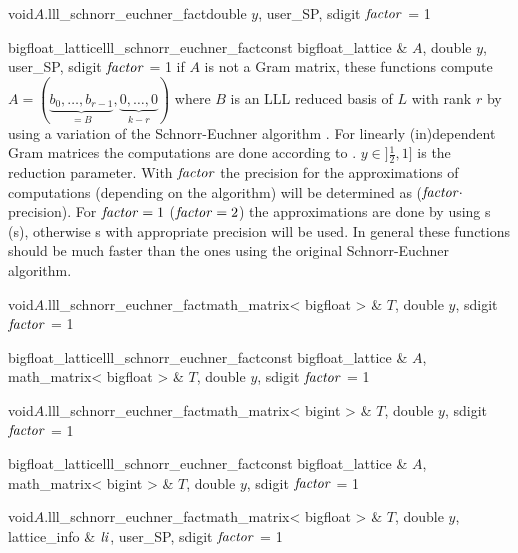 \begin{fcode}{void}{$A$.lll_schnorr_euchner_fact}{double $y$, user_SP, sdigit $\mathit{factor}$ = 1}
\end{fcode}

\begin{fcode}{bigfloat_lattice}{lll_schnorr_euchner_fact}{const bigfloat_lattice & $A$,
    double $y$, user_SP, sdigit $\mathit{factor}$ = 1}%
  if $A$ is not a Gram matrix, these functions compute $A = (\underbrace{b_0, \dots,
    b_{r-1}}_{=B}, \underbrace{0, \dots, 0}_{k-r})$ where $B$ is an LLL reduced basis of $L$
  with rank $r$ by using a variation of the Schnorr-Euchner algorithm \cite{Wetzel/Backes:2000}.
  For linearly (in)dependent Gram matrices the computations are done according to
  \cite{Cohen:1995}.  $y\in ]\frac{1}{2},1]$ is the reduction parameter.  With $\mathit{factor}$ the
  precision for the approximations of computations (depending on the algorithm) will be
  determined as ($\mathit{factor} \cdot$  precision).  For $\mathit{factor} = 1$ ($\mathit{factor} = 2$)
  the approximations are done by using s (s), otherwise
  s with appropriate precision will be used.  In general these functions should
  be much faster than the ones using the original Schnorr-Euchner algorithm.
\end{fcode}

\begin{fcode}{void}{$A$.lll_schnorr_euchner_fact}{math_matrix< bigfloat > & $T$, double $y$,
    sdigit $\mathit{factor}$ = 1}%
\end{fcode}

\begin{fcode}{bigfloat_lattice}{lll_schnorr_euchner_fact}{const bigfloat_lattice & $A$,
    math_matrix< bigfloat > & $T$, double $y$, sdigit $\mathit{factor}$ = 1}%
\end{fcode}

\begin{fcode}{void}{$A$.lll_schnorr_euchner_fact}{math_matrix< bigint > & $T$, double $y$,
    sdigit $\mathit{factor}$ = 1}%
\end{fcode}

\begin{fcode}{bigfloat_lattice}{lll_schnorr_euchner_fact}{const bigfloat_lattice & $A$,
    math_matrix< bigint > & $T$, double $y$, sdigit $\mathit{factor}$ = 1}%
\end{fcode}

\begin{fcode}{void}{$A$.lll_schnorr_euchner_fact}{math_matrix< bigfloat > & $T$, double $y$,
    lattice_info & $\mathit{li}$, user_SP, sdigit $\mathit{factor}$ = 1}%
\end{fcode}

